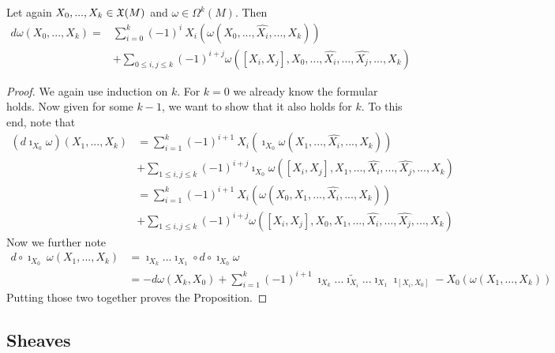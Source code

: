 \begin{prop}
  Let again  $X_0,...,X_{k} \in \mathfrak{X}(M)$ and $\omega \in \Omega^k(M)$. Then
  \begin{align*}
    d\omega(X_0, ..., X_k) =& \sum_{i=0}^{k} (-1)^i \ X_i(\omega(X_0, ..., \widehat{X_i}, ..., X_k))\\
    &+ \sum_{0 \leq i,j \leq k} (-1)^{i+j} \omega([X_i,X_j], X_0, ..., \widehat{X_i}, ..., \widehat{X_j}, ..., X_k)
  \end{align*}
  \begin{proof}
    We again use induction on $k$. For $k=0$ we already know the formular holds. Now given for some $k-1$, we want to show that it also holds for $k$. To this end, note that
    \begin{align*}
      (d\imath_{X_0}\omega)(X_1, ..., X_k) &= \sum_{i=1}^{k} (-1)^{i+1} \ X_i(\imath_{X_0} \omega(X_1, ..., \widehat{X_i}, ..., X_k))\\
      &+  \sum_{1 \leq i,j \leq k} (-1)^{i+j} \imath_{X_0} \omega([X_i,X_j], X_1, ..., \widehat{X_i}, ..., \widehat{X_j}, ..., X_k)\\
      &= \sum_{i=1}^{k} (-1)^{i+1} \ X_i( \omega(X_0, X_1, ..., \widehat{X_i}, ..., X_k))\\
      &+  \sum_{1 \leq i,j \leq k} (-1)^{i+j} \omega([X_i,X_j],X_0,  X_1, ..., \widehat{X_i}, ..., \widehat{X_j}, ..., X_k)
    \end{align*}
    Now we further note
    \begin{align*}
      d\circ \imath_{X_0}\ \omega(X_1, ..., X_k) &= \imath_{X_k} ... \imath_{X_1} \circ d\circ \imath_{X_0} \omega\\
      &= -d\omega(X_k, X_0) + \sum_{i=1}^k (-1)^{i+1} \ \imath_{X_k} ... \widetilde{\imath_{X_i}} ... \imath_{X_1} \imath_{[X_i, X_0]} - X_0 (\omega(X_1, ..., X_k))
    \end{align*}
    Putting those two together proves the Proposition.
  \end{proof}
\end{prop}

\newpage
\subsection{Sheaves}

